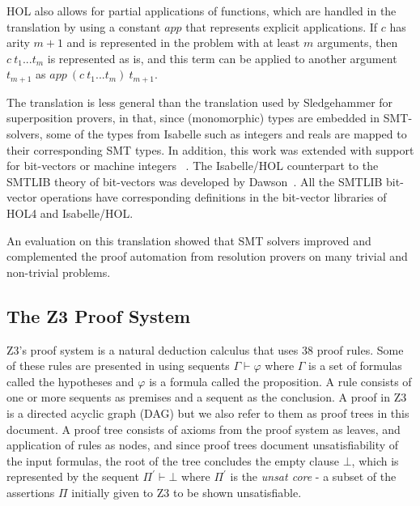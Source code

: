 \documentclass{article}
\begin{document}
		HOL also allows for partial applications of 
		functions, which are handled in the translation
		by using a constant $app$ that represents 
		explicit applications. If $c$ has arity 
		$m+1$ and is represented in the problem 
		with at least $m$ arguments, then 
		$c\ t_1 ... t_m$ is represented as is, 
		and this term can be applied to another 
		argument $t_{m+1}$ as 
		$app\ (c\ t_1 ... t_m)\ t_{m+1}$.
		
		The translation is less general than the 
		translation used by Sledgehammer for 
		superposition provers, in that, since (monomorphic) 
		types are embedded in SMT-solvers, some of the 
		types from Isabelle such as integers and reals 
		are mapped to their corresponding SMT types.
		In addition, this work was extended with 
		support for bit-vectors or machine integers
		~\cite{10.1007/978-3-642-25379-9_15}. The 
		Isabelle/HOL counterpart to the SMTLIB 
		theory of bit-vectors was developed by 
		Dawson~\cite{DAWSON200955}. All the SMTLIB
		bit-vector operations have corresponding 
		definitions in the bit-vector libraries of 
		HOL4 and Isabelle/HOL.
		
		An evaluation on this translation showed that SMT 
		solvers improved and complemented the proof automation 
		from resolution provers on many trivial and non-trivial 
		problems.
		
	\subsection{The Z3 Proof System}
		Z3's proof system is a natural deduction 
		calculus that uses 38 proof rules. Some of 
		these rules are presented in 
		using sequents $\Gamma \vdash \varphi$ where 
		$\Gamma$ is a set of formulas called the hypotheses
		and $\varphi$ is a formula called the proposition. 
		A rule consists of one or more sequents as 
		premises and a sequent as the conclusion. A
		proof in Z3 is a directed acyclic graph (DAG)
		but we also refer to them as proof trees in
		this document. A proof tree consists of axioms 
		from the proof system as leaves, and application 
		of rules as nodes, and since proof trees 
		document unsatisfiability of the input 
		formulas, the root of the tree concludes the 
		empty clause $\bot$, which is represented by 
		the sequent $\Pi^\prime \vdash \bot$ where 
		$\Pi^\prime$ is the \textit{unsat core} - 
		a subset of the assertions $\Pi$
		initially given to Z3 to be shown unsatisfiable.
		
\end{document}
